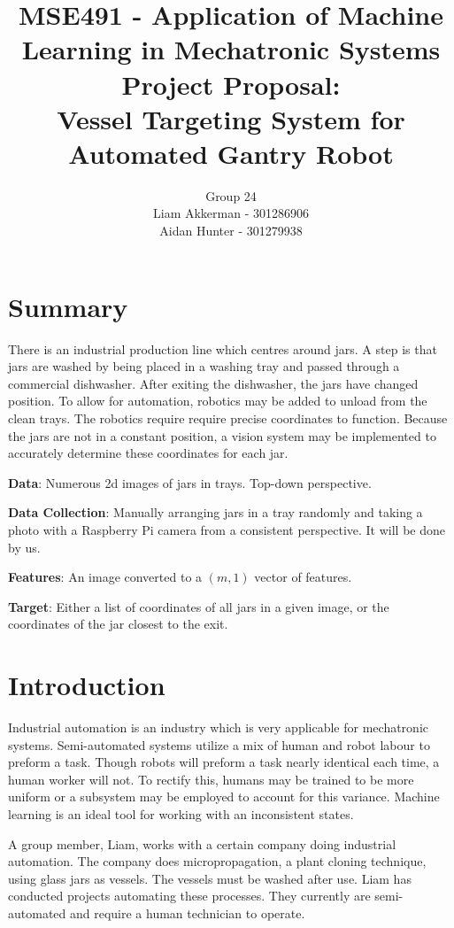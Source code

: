 \documentclass[11pt]{article}
\title{{\large MSE491 - Application of Machine Learning in Mechatronic Systems} \\ Project Proposal: \\ Vessel Targeting System for Automated Gantry Robot}
\author{Group 24 \\ Liam Akkerman - 301286906 \\ Aidan Hunter - 301279938}
\begin{document}
    \maketitle
    \newpage

    \section{Summary}
        There is an industrial production line which centres around jars. A step is that jars are washed by being placed in a washing tray and passed through a commercial dishwasher. After exiting the dishwasher, the jars have changed position. To allow for automation, robotics may be added to unload from the clean trays. The robotics require require precise coordinates to function. Because the jars are not in a constant position, a vision system may be implemented to accurately determine these coordinates for each jar.

        \textbf{Data}: Numerous 2d images of jars in trays. Top-down perspective.

        \textbf{Data Collection}: Manually arranging jars in a tray randomly and taking a photo with a Raspberry Pi camera from a consistent perspective. It will be done by us.

        \textbf{Features}: An image converted to a \( (m,1) \) vector of features.

        \textbf{Target}: Either a list of coordinates of all jars in a given image, or the coordinates of the jar closest to the exit.

    \section{Introduction}
        Industrial automation is an industry which is very applicable for mechatronic systems. Semi-automated systems utilize a mix of human and robot labour to preform a task. Though robots will preform a task nearly identical each time, a human worker will not. To rectify this, humans may be trained to be more uniform or a subsystem may be employed to account for this variance. Machine learning is an ideal tool for working with an inconsistent states.

        A group member, Liam, works with a certain company doing industrial automation. The company does micropropagation, a plant cloning technique, using glass jars as vessels. The vessels must be washed after use. Liam has conducted projects automating these processes. They currently are semi-automated and require a human technician to operate.
\end{document}
